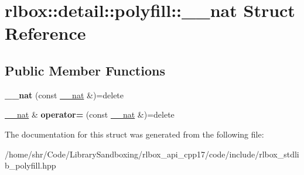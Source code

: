\hypertarget{structrlbox_1_1detail_1_1polyfill_1_1____nat}{}\section{rlbox\+:\+:detail\+:\+:polyfill\+:\+:\+\_\+\+\_\+nat Struct Reference}
\label{structrlbox_1_1detail_1_1polyfill_1_1____nat}
\subsection*{Public Member Functions}
\begin{DoxyCompactItemize}
\item 
\mbox{\label{structrlbox_1_1detail_1_1polyfill_1_1____nat_a8dadab1bd03e7932154cab0c5c33d848}} 
{\bfseries \+\_\+\+\_\+nat} (const \hyperlink{structrlbox_1_1detail_1_1polyfill_1_1____nat}{\+\_\+\+\_\+nat} \&)=delete
\item 
\mbox{\label{structrlbox_1_1detail_1_1polyfill_1_1____nat_a54a77343b44d5061d576b291d8046080}} 
\hyperlink{structrlbox_1_1detail_1_1polyfill_1_1____nat}{\+\_\+\+\_\+nat} \& {\bfseries operator=} (const \hyperlink{structrlbox_1_1detail_1_1polyfill_1_1____nat}{\+\_\+\+\_\+nat} \&)=delete
\end{DoxyCompactItemize}


The documentation for this struct was generated from the following file\+:\begin{DoxyCompactItemize}
\item 
/home/shr/\+Code/\+Library\+Sandboxing/rlbox\+\_\+api\+\_\+cpp17/code/include/rlbox\+\_\+stdlib\+\_\+polyfill.\+hpp\end{DoxyCompactItemize}
